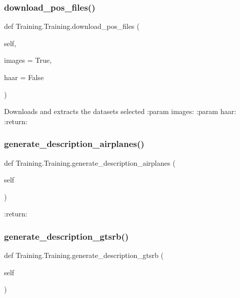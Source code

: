 \subsubsection{\texorpdfstring{download\+\_\+pos\+\_\+files()}{download\_pos\_files()}}
{\footnotesize\ttfamily def Training.\+Training.\+download\+\_\+pos\+\_\+files (\begin{DoxyParamCaption}\item[{}]{self,  }\item[{}]{images = {\ttfamily True},  }\item[{}]{haar = {\ttfamily False} }\end{DoxyParamCaption})}

\begin{DoxyVerb}Downloads and extracts the datasets selected
:param images:
:param haar:
:return:
\end{DoxyVerb}
 \mbox{\label{class_training_1_1_training_a81056ed2095ad847bda80bf05a92ed7f}} 
\subsubsection{\texorpdfstring{generate\+\_\+description\+\_\+airplanes()}{generate\_description\_airplanes()}}
{\footnotesize\ttfamily def Training.\+Training.\+generate\+\_\+description\+\_\+airplanes (\begin{DoxyParamCaption}\item[{}]{self }\end{DoxyParamCaption})}

\begin{DoxyVerb}:return:
\end{DoxyVerb}
 \mbox{\label{class_training_1_1_training_a28507bbd67dcd1161275a3d2b407b09a}} 
\subsubsection{\texorpdfstring{generate\+\_\+description\+\_\+gtsrb()}{generate\_description\_gtsrb()}}
{\footnotesize\ttfamily def Training.\+Training.\+generate\+\_\+description\+\_\+gtsrb (\begin{DoxyParamCaption}\item[{}]{self }\end{DoxyParamCaption})}

